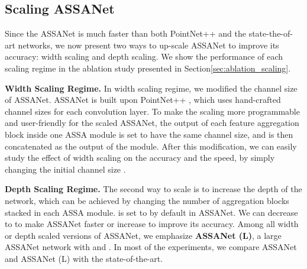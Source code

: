 \documentclass{article}
\newcommand{\secLabel}{Section\xspace}
\newcommand{\mysection}[1]{\vspace{3pt}\noindent\textbf{#1.}}
\begin{document}
\subsection{Scaling ASSANet}
Since the ASSANet is much faster than both PointNet++ \cite{Qi2017PointNetDH} and the state-the-of-art networks, we now present two ways to up-scale ASSANet to improve its accuracy: width scaling and depth scaling. We show the performance of each scaling regime in the ablation study presented in \secLabel \ref{sec:ablation_scaling}. 

\mysection{Width Scaling Regime} 
In width scaling regime, we modified the channel size of ASSANet. ASSANet is built upon PointNet++ \cite{Qi2017PointNetDH}, which uses hand-crafted channel sizes for each convolution layer. To make the scaling more programmable and user-friendly for the scaled ASSANet, the output of each feature aggregation block inside one ASSA module is set to have the same channel size, and is then concatenated as the output of the module. After this modification, we can easily study the effect of width scaling on the accuracy and the speed, by simply changing the initial channel size .

\mysection{Depth Scaling Regime} 
The second way to scale is to increase the depth of the network, which can be achieved by changing the number of aggregation blocks  stacked in each ASSA module.  is set to  by default in ASSANet. We can decrease  to  to make ASSANet faster or increase  to improve its accuracy. Among all width or depth scaled versions of ASSANet, we emphasize \textbf{ASSANet (L)}, a large ASSANet network with  and . In most of the experiments, we compare ASSANet and ASSANet (L) with the state-of-the-art. 
\end{document}
